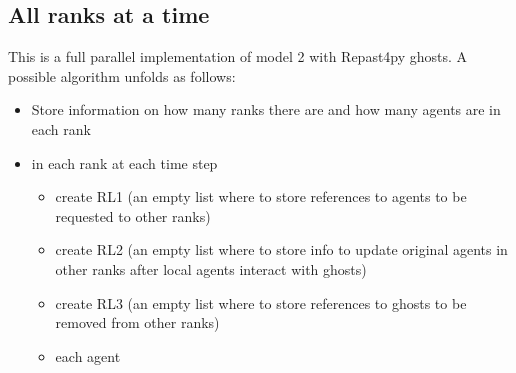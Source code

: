 \documentclass{article}
\providecommand{\tightlist}{%
  \setlength{\itemsep}{0pt}\setlength{\parskip}{0pt}}
\begin{document}
\subsection{All ranks at a time}
This is a full parallel implementation of model 2 with Repast4py ghosts.
A possible algorithm unfolds as follows:
\begin{itemize}
\tightlist
\item
  Store information on how many ranks there are and how many agents are
  in each rank
\item
  in each rank at each time step

  \begin{itemize}
  \tightlist
  \item
    create RL1 (an empty list where to store references to agents to be requested to other ranks)
  \item
    create RL2 (an empty list where to store info to update original agents in other ranks after local agents interact with ghosts)
  \item
    create RL3 (an empty list where to store references to ghosts to be removed from other ranks)
  \item
    each agent


\end{itemize}
\end{itemize}
\end{document}
